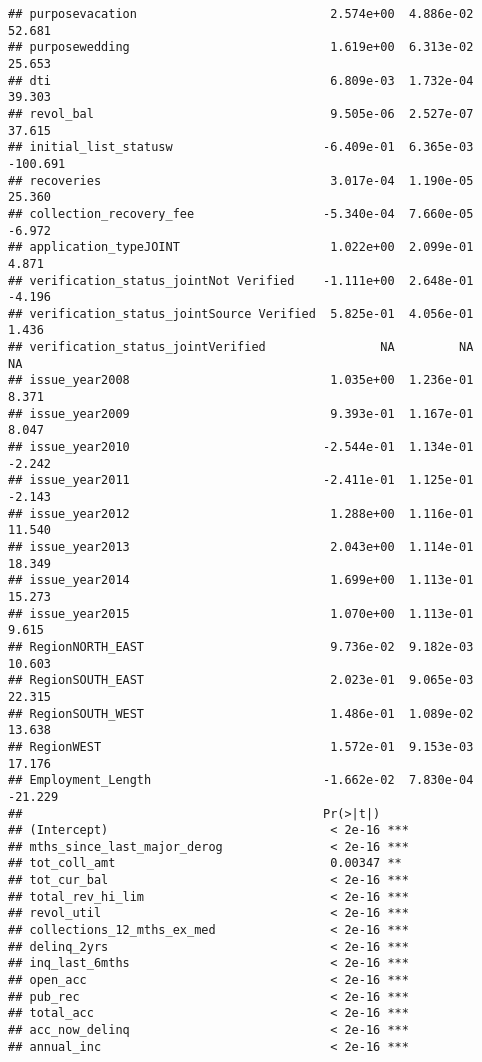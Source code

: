 \documentclass[]{article}
\begin{document}
\begin{verbatim}
## purposevacation                           2.574e+00  4.886e-02   52.681
## purposewedding                            1.619e+00  6.313e-02   25.653
## dti                                       6.809e-03  1.732e-04   39.303
## revol_bal                                 9.505e-06  2.527e-07   37.615
## initial_list_statusw                     -6.409e-01  6.365e-03 -100.691
## recoveries                                3.017e-04  1.190e-05   25.360
## collection_recovery_fee                  -5.340e-04  7.660e-05   -6.972
## application_typeJOINT                     1.022e+00  2.099e-01    4.871
## verification_status_jointNot Verified    -1.111e+00  2.648e-01   -4.196
## verification_status_jointSource Verified  5.825e-01  4.056e-01    1.436
## verification_status_jointVerified                NA         NA       NA
## issue_year2008                            1.035e+00  1.236e-01    8.371
## issue_year2009                            9.393e-01  1.167e-01    8.047
## issue_year2010                           -2.544e-01  1.134e-01   -2.242
## issue_year2011                           -2.411e-01  1.125e-01   -2.143
## issue_year2012                            1.288e+00  1.116e-01   11.540
## issue_year2013                            2.043e+00  1.114e-01   18.349
## issue_year2014                            1.699e+00  1.113e-01   15.273
## issue_year2015                            1.070e+00  1.113e-01    9.615
## RegionNORTH_EAST                          9.736e-02  9.182e-03   10.603
## RegionSOUTH_EAST                          2.023e-01  9.065e-03   22.315
## RegionSOUTH_WEST                          1.486e-01  1.089e-02   13.638
## RegionWEST                                1.572e-01  9.153e-03   17.176
## Employment_Length                        -1.662e-02  7.830e-04  -21.229
##                                          Pr(>|t|)    
## (Intercept)                               < 2e-16 ***
## mths_since_last_major_derog               < 2e-16 ***
## tot_coll_amt                              0.00347 ** 
## tot_cur_bal                               < 2e-16 ***
## total_rev_hi_lim                          < 2e-16 ***
## revol_util                                < 2e-16 ***
## collections_12_mths_ex_med                < 2e-16 ***
## delinq_2yrs                               < 2e-16 ***
## inq_last_6mths                            < 2e-16 ***
## open_acc                                  < 2e-16 ***
## pub_rec                                   < 2e-16 ***
## total_acc                                 < 2e-16 ***
## acc_now_delinq                            < 2e-16 ***
## annual_inc                                < 2e-16 ***

\end{verbatim}
\end{document}
